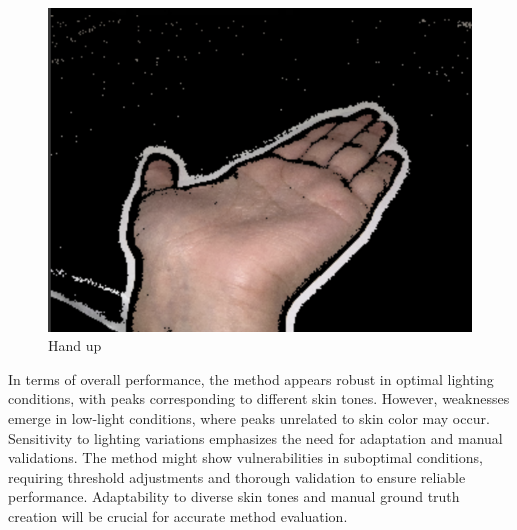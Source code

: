 \documentclass{report}
\begin{document}
\begin{figure}[H]
    \includegraphics[width=\linewidth]{Images/hand_upHSV_J.png}
    \caption{Hand up}
  \endminipage\hfill
\end{figure}
In terms of overall performance, the method appears robust in optimal lighting conditions, with peaks corresponding to different skin tones. However, weaknesses emerge in low-light conditions, where peaks unrelated to skin color may occur. Sensitivity to lighting variations emphasizes the need for adaptation and manual validations. The method might show vulnerabilities in suboptimal conditions, requiring threshold adjustments and thorough validation to ensure reliable performance. Adaptability to diverse skin tones and manual ground truth creation will be crucial for accurate method evaluation.
\end{document}
